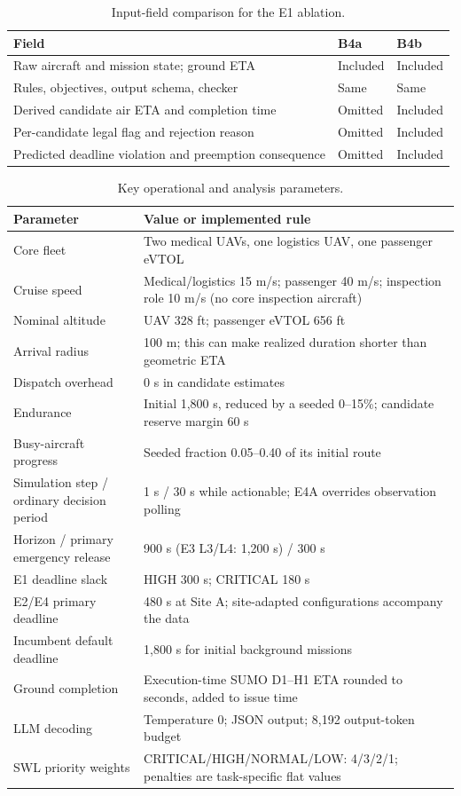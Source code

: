 \documentclass[11pt,a4paper]{article}
\begin{document}
\begin{table}[H]\centering\small
\caption{Input-field comparison for the E1 ablation.}\label{tab:S10}
\begin{tabularx}{\textwidth}{@{}Yll@{}}\toprule
Field & B4a & B4b \\\midrule
Raw aircraft and mission state; ground ETA & Included & Included \\
Rules, objectives, output schema, checker & Same & Same \\
Derived candidate air ETA and completion time & Omitted & Included \\
Per-candidate legal flag and rejection reason & Omitted & Included \\
Predicted deadline violation and preemption consequence & Omitted & Included \\\bottomrule
\end{tabularx}\end{table}

\begin{table}[H]\centering\small
\caption{Key operational and analysis parameters.}\label{tab:S11}
\begin{tabularx}{\textwidth}{@{}lY@{}}\toprule
Parameter & Value or implemented rule \\\midrule
Core fleet & Two medical UAVs, one logistics UAV, one passenger eVTOL \\
Cruise speed & Medical/logistics 15 m/s; passenger 40 m/s; inspection role 10 m/s (no core inspection aircraft) \\
Nominal altitude & UAV 328 ft; passenger eVTOL 656 ft \\
Arrival radius & 100 m; this can make realized duration shorter than geometric ETA \\
Dispatch overhead & 0 s in candidate estimates \\
Endurance & Initial 1,800 s, reduced by a seeded 0--15\%; candidate reserve margin 60 s \\
Busy-aircraft progress & Seeded fraction 0.05--0.40 of its initial route \\
Simulation step / ordinary decision period & 1 s / 30 s while actionable; E4A overrides observation polling \\
Horizon / primary emergency release & 900 s (E3 L3/L4: 1,200 s) / 300 s \\
E1 deadline slack & HIGH 300 s; CRITICAL 180 s \\
E2/E4 primary deadline & 480 s at Site A; site-adapted configurations accompany the data \\
Incumbent default deadline & 1,800 s for initial background missions \\
Ground completion & Execution-time SUMO D1--H1 ETA rounded to seconds, added to issue time \\
LLM decoding & Temperature 0; JSON output; 8,192 output-token budget \\
SWL priority weights & CRITICAL/HIGH/NORMAL/LOW: 4/3/2/1; penalties are task-specific flat values \\\bottomrule
\end{tabularx}\end{table}
\end{document}
